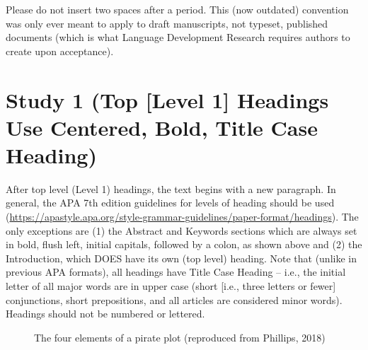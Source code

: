 \documentclass{ldr-article}
\begin{document}
Please do not insert two spaces after a period. This (now outdated) convention was only ever meant to apply to draft manuscripts, not typeset, published documents (which is what Language Development Research requires authors to create upon acceptance).

\section{Study 1 (Top [Level 1] Headings Use Centered, Bold, Title Case Heading)}

After top level (Level 1) headings, the text begins with a new paragraph. In general, the APA 7th edition guidelines for levels of heading should be used (\url{https://apastyle.apa.org/style-grammar-guidelines/paper-format/headings}). The only exceptions are (1) the Abstract and Keywords sections which are always set in bold, flush left, initial capitals, followed by a colon, as shown above and (2) the Introduction, which DOES have its own (top level) heading. Note that (unlike in previous APA formats), all headings have Title Case Heading – i.e., the initial letter of all major words are in upper case (short [i.e., three letters or fewer] conjunctions, short prepositions, and all articles are considered minor words). Headings should not be numbered or lettered.

\begin{figure}[htb]
\caption{\label{fig:example_figure} The four elements of a pirate plot (reproduced from Phillips, 2018)}
\end{figure}
\end{document}
